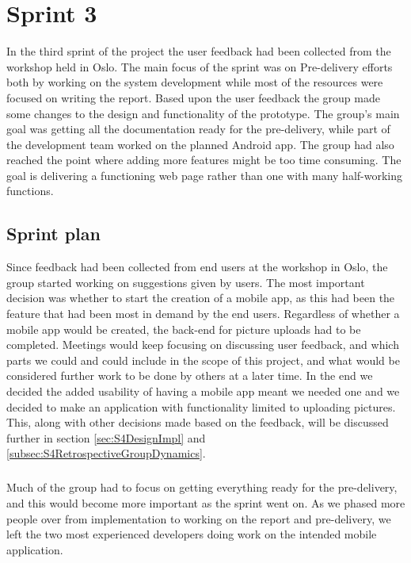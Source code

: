 \chapter{Sprint 3}
\label{chap:S4}

In the third sprint of the project the user feedback had been collected from the workshop held in Oslo. The main focus of the sprint was on Pre-delivery efforts both by working on the system development while most of the resources were focused on writing the report. Based upon the user feedback the group made some changes to the design and functionality of the prototype. The group's main goal was getting all the documentation ready for the pre-delivery, while part of the development team worked on the planned Android app. The group had also reached the point where adding more features might be too time consuming. The goal is delivering a functioning web page rather than one with many half-working functions.

\section{Sprint plan}
\label{sec:S4Plan}

Since feedback had been collected from end users at the workshop in Oslo, the group started working on suggestions given by users. The most important decision was whether to start the creation of a mobile app, as this had been the feature that had been most in demand by the end users. Regardless of whether a mobile app would be created, the back-end for picture uploads had to be completed. Meetings would keep focusing on discussing user feedback, and which parts we could and could include in the scope of this project, and what would be considered further work to be done by others at a later time. In the end we decided the added usability of having a mobile app meant we needed one and we decided to make an application with functionality limited to uploading pictures. This, along with other decisions made based on the feedback, will be discussed further in section \ref{sec:S4DesignImpl} and \ref{subsec:S4RetrospectiveGroupDynamics}.

\paragraph{} Much of the group had to focus on getting everything ready for the pre-delivery, and this would become more important as the sprint went on. As we phased more people over from implementation to working on the report and pre-delivery, we left the two most experienced developers doing work on the intended mobile application.

